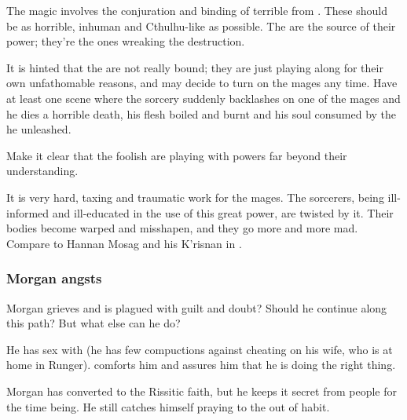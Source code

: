 \begin{garbage}
The magic involves the conjuration and binding of terrible \daemons{} from \Chaos. These should be as horrible, inhuman and Cthulhu-like as possible. The \daemons{} are the source of their power; they're the ones wreaking the destruction. 

It is hinted that the \daemons{} are not really bound; they are just playing along for their own unfathomable reasons, and may decide to turn on the mages any time. Have at least one scene where the sorcery suddenly backlashes on one of the mages and he dies a horrible death, his flesh boiled and burnt and his soul consumed by the \daemon{} he unleashed. 

Make it clear that the foolish \humans{} are playing with powers far beyond their understanding. 

It is very hard, taxing and traumatic work for the mages. The sorcerers, being ill-informed and ill-educated in the use of this great power, are twisted by it. Their bodies become warped and misshapen, and they go more and more mad. Compare to Hannan Mosag and his K'risnan in \cite{StevenEriksonIanCameronEsslemont:MalazanBookoftheFallen}.







\subsubsection{Morgan angsts}
Morgan grieves and is plagued with guilt and doubt? Should he continue along this path? But what else can he do? 

He has sex with \Takestsha{} (he has few compuctions against cheating on his wife, who is at home in Runger). \Takestsha{} comforts him and assures him that he is doing the right thing. 

Morgan has converted to the Rissitic faith, but he keeps it secret from people for the time being. He still catches himself praying to the \Sephiroth{} out of habit. 






\end{garbage}
